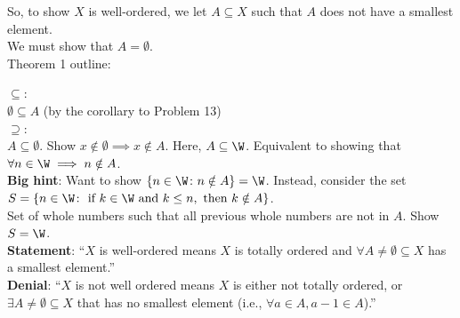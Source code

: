             So, to show $X$ is well-ordered, we let $A\subseteq X$ such that $A$ does not have a smallest element. \\

            We must show that $A = \emptyset$. \\

            Theorem 1 outline:

            $\subseteq$: \\
            $\emptyset \subseteq A$ (by the corollary to Problem 13) \\

            $\supseteq$: \\
            $A \subseteq \emptyset$. Show $x\notin \emptyset \implies x \notin A$. Here, $A \subseteq \W$. Equivalent to showing that $\forall n \in \W \implies n \notin A$. \\  

            \noindent \textbf{Big hint}: Want to show $\{n \in \W \colon n \notin A\} = \W$. Instead, consider the set $S = \{n \in \W \colon \text{ if } k \in \W \text{ and } k \leq n, \text{ then } k \notin A\}$. \\
            Set of whole numbers such that all previous whole numbers are not in $A$. Show $S = \W$. \\

            \textbf{Statement}: ``$X$ is well-ordered means $X$ is totally ordered and $\forall A \ne \emptyset \subseteq X$ has a smallest element.'' \\
            \indent\textbf{Denial}: ``$X$ is not well ordered means $X$ is either not totally ordered, or $\exists A \ne \emptyset \subseteq X$ that has no smallest element (i.e., $\forall a \in A, a- 1 \in A$).''